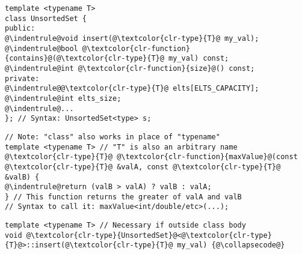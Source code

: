 \documentclass[6.6pt, twocolumn]{extarticle}
\begin{document}
   \begin{minipage}[h]{3.95cm} 
      \begin{tcolorbox}[top=-4pt,bottom=-4pt,left=-7.5pt,right=0pt,,toptitle=-0.6mm,middle=-5pt,
  bottomtitle=-0.6mm,,adjusted title={ Class Template Syntax},fonttitle=\sffamily\bfseries]
              {\lstset{literate=
}
              \begin{lstlisting}[style = mystyle]
template <typename T>
class UnsortedSet {
public:
@\indentrule@void insert(@\textcolor{clr-type}{T}@ my_val); 
@\indentrule@bool @\textcolor{clr-function}{contains}@(@\textcolor{clr-type}{T}@ my_val) const;
@\indentrule@int @\textcolor{clr-function}{size}@() const;
private:
@\indentrule@@\textcolor{clr-type}{T}@ elts[ELTS_CAPACITY];
@\indentrule@int elts_size;
@\indentrule@... 
}; // Syntax: UnsortedSet<type> s;

\end{lstlisting}}
   \end{tcolorbox}
    \end{minipage}
    \hspace{0pt}
   \begin{minipage}[h]{6.25cm} 
      \begin{tcolorbox}[top=-4pt,bottom=-4pt,left=-7.5pt,right=0pt,,toptitle=-0.6mm,middle=-5pt,
  bottomtitle=-0.6mm,,adjusted title={ Function Template Syntax},fonttitle=\sffamily\bfseries]
              {\lstset{literate=
}
              \begin{lstlisting}[style = mystyle]
// Note: "class" also works in place of "typename"
template <typename T> // "T" is also an arbitrary name
@\textcolor{clr-type}{T}@ @\textcolor{clr-function}{maxValue}@(const @\textcolor{clr-type}{T}@ &valA, const @\textcolor{clr-type}{T}@ &valB) {
@\indentrule@return (valB > valA) ? valB : valA;
} // This function returns the greater of valA and valB
// Syntax to call it: maxValue<int/double/etc>(...);

\end{lstlisting}}
   \end{tcolorbox}
         \begin{tcolorbox}[top=-4pt,bottom=-4pt,left=-7.5pt,right=0pt,,toptitle=-0.6mm,middle=-5pt,
  bottomtitle=-0.6mm,,adjusted title={ Templated Class Member Function Syntax},fonttitle=\sffamily\bfseries]
              {\lstset{literate=
}
              \begin{lstlisting}[style = mystyle]
template <typename T> // Necessary if outside class body
void @\textcolor{clr-type}{UnsortedSet}@<@\textcolor{clr-type}{T}@>::insert(@\textcolor{clr-type}{T}@ my_val) {@\collapsecode@}

\end{lstlisting}}
   \end{tcolorbox} 
    \end{minipage}
\end{document}
